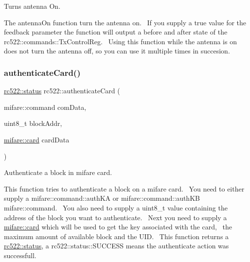 Turns antenna On. 

The antenna\+On function turn the antenna on.~\newline
If you supply a true value for the feedback parameter the function will output a before and after state of the rc522\+::commands\+::\+Tx\+Control\+Reg.~\newline
Using this function while the antenna is on does not turn the antenna off, so you can use it multiple times in succesion. \mbox{\label{classrc522_a9cba68c4fff6e1acf8bf9b2601197d96}} 
\subsubsection{\texorpdfstring{authenticate\+Card()}{authenticateCard()}}
{\footnotesize\ttfamily \hyperlink{classspiReader_a4bcf984823c38cf4841ebf619e788790}{rc522\+::status} rc522\+::authenticate\+Card (\begin{DoxyParamCaption}\item[{mifare\+::command}]{com\+Data,  }\item[{uint8\+\_\+t}]{block\+Addr,  }\item[{\hyperlink{classmifare_1_1card}{mifare\+::card}}]{card\+Data }\end{DoxyParamCaption})}



Authenticate a block in mifare card. 

This function tries to authenticate a block on a mifare card.~\newline
You need to either supply a mifare\+::command\+::auth\+KA or mifare\+::command\+::auth\+KB mifare\+::command.~\newline
You also need to supply a uint8\+\_\+t value containing the address of the block you want to authenticate.~\newline
Next you need to supply a \hyperlink{classmifare_1_1card}{mifare\+::card} which will be used to get the key associated with the card,~\newline
the maximum amount of available block and the U\+ID.~\newline
This function returns a \hyperlink{classspiReader_a4bcf984823c38cf4841ebf619e788790}{rc522\+::status}, a rc522\+::status\+::\+S\+U\+C\+C\+E\+SS means the authenticate action was successfull. \mbox{\label{classrc522_a6d3fe62ea90de72aa783331cf21f54fe}} 
